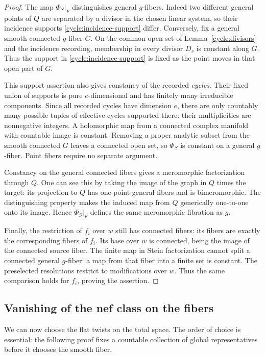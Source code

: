 \begin{proof}
The map $\Phi_S|_F$ distinguishes general $g$-fibers.  Indeed two
different general points of $Q$ are separated by a divisor in the
chosen linear system, so their incidence supports
\eqref{cycle:incidence-support} differ.  Conversely, fix a general
smooth connected $g$-fiber $G$.  On the common open set of
Lemma~\ref{cycle:divisors} and the incidence recording, membership in
every divisor $D_s$ is constant along $G$.  Thus the support in
\eqref{cycle:incidence-support} is fixed as the point moves in that
open part of $G$.

This support assertion also gives constancy of the recorded
\emph{cycles}.  Their fixed union of supports is pure $e$-dimensional
and has finitely many irreducible components.  Since all recorded
cycles have dimension $e$, there are only countably many possible tuples of
effective cycles supported there: their multiplicities are
nonnegative integers.  A holomorphic map from a connected complex
manifold with countable image is constant.  Removing a proper
analytic subset from the smooth connected $G$ leaves a connected
open set, so $\Phi_S$ is constant on a general $g$-fiber.  Point
fibers require no separate argument.

Constancy on the general connected fibers gives a meromorphic
factorization through $Q$.  One can see this by taking the image of
the graph in $Q$ times the target: its projection to $Q$ has one-point
general fibers and is bimeromorphic.  The distinguishing property
makes the induced map from $Q$ generically one-to-one onto its image.
Hence $\Phi_S|_F$ defines the same meromorphic fibration as $g$.

Finally, the restriction of $f_i$ over $w$ still has connected fibers:
its fibers are exactly the corresponding fibers of $f_i$.  Its base
over $w$ is connected, being the image of the connected source fiber.
The finite map in Stein factorization cannot split a connected
general $g$-fiber: a map from that fiber into a finite set is constant.
The preselected resolutions restrict to modifications over $w$.
Thus the same comparison holds for $f_i$, proving the assertion.
\end{proof}

\subsection{Vanishing of the nef class on the fibers}

We can now choose the flat twists on the total space.  The order of
choice is essential: the following proof fixes a countable collection
of global representatives before it chooses the smooth fiber.

